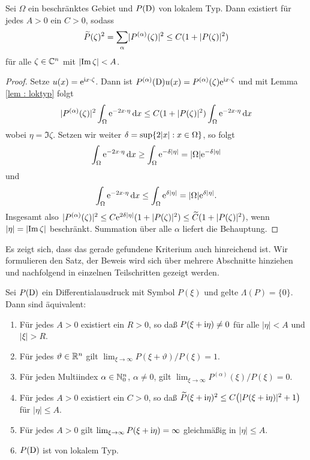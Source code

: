 \begin{lem}
Sei $\Omega$ ein beschränktes Gebiet und $P(\mathrm D)$ von lokalem Typ. Dann existiert für jedes $A>0$ ein $C>0$, sodass
\begin{equation}
\widetilde{P}(\zeta)^2=\sum_\alpha \lvert P^{(\alpha)}(\zeta)\rvert^2\leq C(1+\lvert P(\zeta)\rvert^2)
\end{equation}
für alle $\zeta\in\mathbb C^n$ mit $\lvert\operatorname{Im} \zeta\rvert < A$.
\end{lem}
\begin{proof}
Setze $u(x)=\mathrm e^{\mathrm i x\cdot\zeta}$. Dann ist $P^{(\alpha)}(\mathrm D)u(x)=P^{(\alpha)}(\zeta)\mathrm e^{\mathrm i x\cdot\zeta}$ und mit Lemma \ref{lem : loktyp} folgt
\begin{equation}
\lvert P^{(\alpha)}(\zeta)\rvert^2 \int_{\Omega} \mathrm e^{-2x\cdot \eta}\,\mathrm d x \leq C(1+\lvert P(\zeta)\rvert^2)\int_\Omega \mathrm e^{-2x\cdot \eta}\,\mathrm d x
\end{equation}
wobei $\eta = \Im \zeta$. Setzen wir weiter $\delta = \sup \{2\lvert x\rvert:x\in\Omega\}$, so folgt
\begin{equation}
\int_\Omega \mathrm e^{-2x\cdot \eta}\,\mathrm d x \geq \int_\Omega \mathrm e^{-\delta \lvert\eta\rvert}=\lvert\Omega\rvert\mathrm e^{-\delta \lvert\eta\rvert}
\end{equation}
und
\begin{equation}
\int_\Omega \mathrm e^{-2x\cdot \eta}\,\mathrm d x \leq \int_\Omega \mathrm e^{\delta \lvert\eta\rvert}=\lvert\Omega\rvert\mathrm e^{\delta \lvert\eta\rvert}.
\end{equation}
Insgesamt also $\lvert P^{(\alpha)}(\zeta)\rvert^2\leq C\mathrm e^{2\delta \lvert\eta\rvert}(1+\lvert P(\zeta)\rvert^2)\leq \widetilde{C}(1+\lvert P(\zeta)\rvert^2) $, wenn $\lvert\eta\rvert=\lvert\operatorname{Im} \zeta\rvert$ beschränkt. Summation über alle $\alpha$ liefert die Behauptung.
\end{proof}


%
%

Es zeigt sich, dass das gerade gefundene Kriterium auch hinreichend ist. Wir formulieren den Satz, der Beweis wird sich über mehrere Abschnitte hinziehen und nachfolgend in einzelnen Teilschritten gezeigt werden.

\begin{thm}\label{thm:3:3.3}
Sei $P(\mathrm D)$ ein Differentialausdruck mit Symbol $P(\xi)$ und gelte $\Lambda(P)=\{0\}$. Dann sind \"aquivalent:
\begin{enumerate}
\item Für jedes $A>0$ existiert ein $R>0$, so daß $P(\xi+\mathrm i\eta)\ne0$ für alle $|\eta|<A$ und $|\xi|>R$.
\item Für jedes $\vartheta\in\mathbb R^n$ gilt $\lim_{\xi\to\infty} P(\xi+\vartheta)/P(\xi)=1$.
\item Für jeden Multiindex $\alpha\in\mathbb N_0^n$, $\alpha\ne0$, gilt $\lim_{\xi\to\infty} P^{(\alpha)}(\xi)/P(\xi)=0$.
\item Für jedes $A>0$ existiert ein $C>0$, so daß $\widetilde P(\xi+\mathrm i\eta)^2\le C\big(|P(\xi+\mathrm i\eta)|^2+1\big)$ für $|\eta|\le A$.
\item Für jedes $A>0$ gilt $\lim_{\xi\to\infty} P(\xi+\mathrm i\eta)=\infty$ gleichmäßig in $|\eta|\le A$.
\item $P(\mathrm D)$ ist von lokalem Typ.
\end{enumerate}
\end{thm} 

